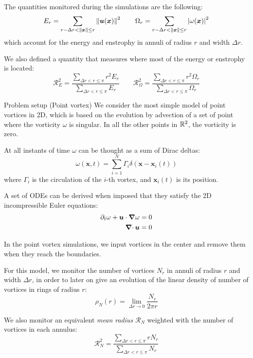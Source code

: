 \documentclass{beamer} %
\begin{document}
\begin{frame}
	The quantities monitored during the simulations are the following:
	$$
		E_r      = \sum_{r-\Delta r<\left\|\boldsymbol{x}\right\|\leq r} \left\|{\boldsymbol{u}}(\boldsymbol{x})\right\|^2 \qquad
		\Omega_r = \sum_{r-\Delta r<\left\|\boldsymbol{x}\right\|\leq r} \abs{{{\omega}}(\boldsymbol{x})}^2
	$$
	which account for the energy and enstrophy in annuli of radius $r$ and width $\Delta r$.

	We also defined a quantity that measures where most of the energy or enstrophy is located:
	$$
		\mathcal{R}_E^2      = \frac{\sum_{\Delta r<r\leq \pi} r^2 E_r}{\sum_{\Delta r<r\leq \pi} E_r}\qquad 	\mathcal{R}_\Omega^2 = \frac{\sum_{\Delta r<r\leq \pi} r^2 \Omega_r}{\sum_{\Delta r<r\leq \pi} \Omega_r}
	$$
\end{frame}
\begin{frame}{Problem setup (Point vortex)}
	We consider the most simple model of point vortices in 2D, which is based on the evolution by advection of a set of point where the vorticity $\omega$ is singular. In all the other points in $\mathbb{R}^2$, the vorticity is zero.

	At all instants of time $\omega$ can be thought as a sum of Dirac deltas:
	\begin{equation*}
		\omega(\mathbf{x},t) = \sum_{i=1}^{N} \Gamma_i \delta(\mathbf{x} - \mathbf{x}_i(t))
	\end{equation*}
	where $\Gamma_i$ is the circulation of the $i$-th vortex, and $\mathbf{x}_i(t)$ is its position.

	A set of ODEs can be derived when imposed that they satisfy the 2D incompressible Euler equations:
	\begin{align*}
		\partial_t{\omega} + \boldsymbol{u} \cdot \grad {\omega} & = 0 \\
		\operatorname{\boldsymbol{\nabla}\cdot} \boldsymbol{u}                                     & = 0
	\end{align*}
\end{frame}
\begin{frame}
	In the point vortex simulations, we input vortices in the center and remove them when they reach the boundaries.

	For this model, we monitor the number of vortices $N_r$ in annuli of radius $r$ and width $\Delta r$, in order to later on give an evolution of the linear density of number of vortices in rings of radius $r$:
	$$
		\rho_N(r) = \lim_{\Delta r\to 0} \frac{N_r}{2\pi r}
	$$

	We also monitor an equivalent \emph{mean radius} $\mathcal{R}_N$ weighted with the number of vortices in each annulus:
	$$
		\mathcal{R}_N^2 = \frac{\sum_{\Delta r<r\leq \pi} r N_r}{\sum_{\Delta r<r\leq \pi} N_r}
	$$
\end{frame}
\end{document}
